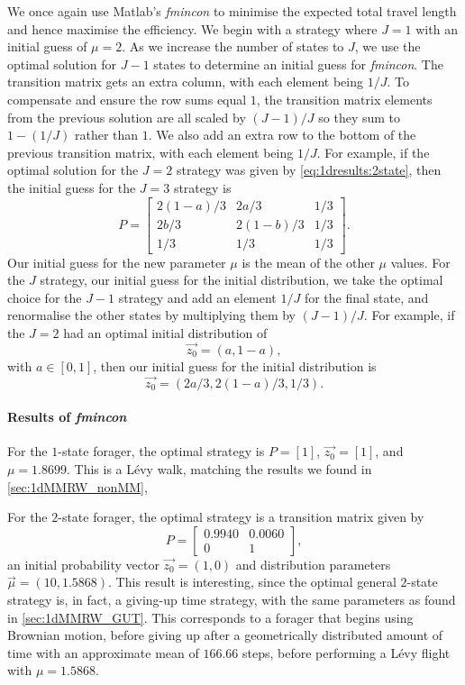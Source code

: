 We once again use Matlab's \emph{fmincon} to minimise the expected total travel length and hence maximise the efficiency. We begin with a strategy where $J=1$ with an initial guess of $\mu=2$. As we increase the number of states to $J$, we use the optimal solution for $J-1$ states to determine an initial guess for \emph{fmincon}. The transition matrix gets an extra column, with each element being $1/J$. To compensate and ensure the row sums equal $1$, the transition matrix elements from the previous solution are all scaled by $(J-1)/J$ so they sum to $1-(1/J)$ rather than $1$. We also add an extra row to the bottom of the previous transition matrix, with each element being $1/J$. For example, if the optimal solution for the $J=2$ strategy was given by \cref{eq:1dresults:2state}, then the initial guess for the $J=3$ strategy is
\begin{equation*}
P = \begin{bmatrix}
2(1-a)/3 & 2a/3 & 1/3\\
2b/3 & 2(1-b)/3 & 1/3\\
1/3 & 1/3 & 1/3
\end{bmatrix}.
\end{equation*}
Our initial guess for the new parameter $\mu$ is the mean of the other $\mu$ values. For the $J$ strategy, our initial guess for the initial distribution, we take the optimal choice for the $J-1$ strategy and add an element $1/J$ for the final state, and renormalise the other states by multiplying them by $(J-1)/J$. For example, if the $J=2$ had an optimal initial distribution of
\begin{equation*}
\vec{z_{0}} = (a,1-a),
\end{equation*}
with $a \in [0,1]$, then our initial guess for the initial distribution is
\begin{equation*}
\vec{z_0} = \left(2a/3, 2(1-a)/3, 1/3 \right).
\end{equation*}

\paragraph{Results of \emph{fmincon}}
For the $1$-state forager, the optimal strategy is $P=[1]$, $\vec{z_{0}}=[1]$, and $\mu = 1.8699$. This is a L\'{e}vy walk, matching the results we found in \cref{sec:1dMMRW_nonMM},

For the $2$-state forager, the optimal strategy is a transition matrix given by
\begin{equation*}
P = \begin{bmatrix}
0.9940  &  0.0060\\
0  &  1
\end{bmatrix},
\end{equation*}
an initial probability vector $\vec{z_{0}} = (1, 0)$ and distribution parameters $\vec{\mu} = (10,    1.5868)$. This result is interesting, since the optimal general $2$-state strategy is, in fact, a giving-up time strategy, with the same parameters as found in \cref{sec:1dMMRW_GUT}. This corresponds to a forager that begins using Brownian motion, before giving up after a geometrically distributed amount of time with an approximate mean of $166.66$ steps, before performing a L\'{e}vy flight with $\mu=1.5868$. 

